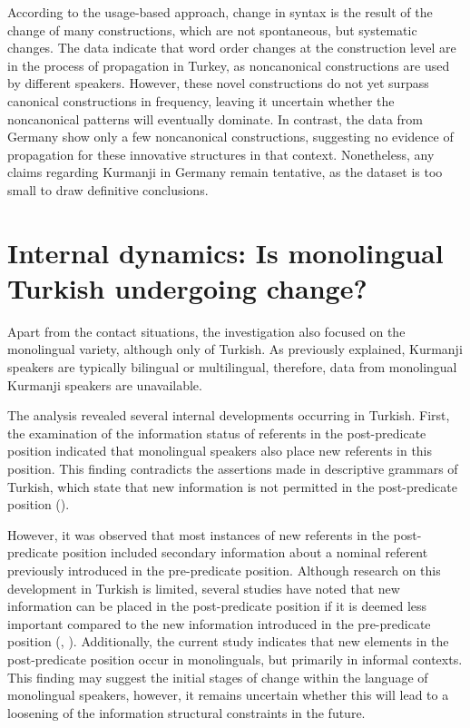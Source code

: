 According to the usage-based approach, change in syntax is the result of the change of many constructions, which are not spontaneous, but systematic changes. The data indicate that word order changes at the construction level are in the process of propagation in Turkey, as noncanonical constructions are used by different speakers. However, these novel constructions do not yet surpass canonical constructions in frequency, leaving it uncertain whether the noncanonical patterns will eventually dominate. In contrast, the data from Germany show only a few noncanonical constructions, suggesting no evidence of propagation for these innovative structures in that context. Nonetheless, any claims regarding Kurmanji in Germany remain tentative, as the dataset is too small to draw definitive conclusions.

\section{Internal dynamics: Is monolingual Turkish undergoing change?}\label{sec:key:7.2}

Apart from the contact situations, the investigation also focused on the monolingual variety, although only of Turkish. As previously explained, Kurmanji speakers are typically bilingual or multilingual, therefore, data from monolingual Kurmanji speakers are unavailable.

The analysis revealed several internal developments occurring in Turkish. First, the examination of the information status of referents in the post-predicate position indicated that monolingual speakers also place new referents in this position. This finding contradicts the assertions made in descriptive grammars of Turkish, which state that new information is not permitted in the post-predicate position (\citealt{Erguvanli1984, GokselÖzsoy2000, Issever2003}).

However, it was observed that most instances of new referents in the post-predicate position included secondary information about a nominal referent previously introduced in the pre-predicate position. Although research on this development in Turkish is limited, several studies have noted that new information can be placed in the post-predicate position if it is deemed less important compared to the new information introduced in the pre-predicate position (\citealt{DogruozBackus2007}, \citealt{AkanHartmann2019, Issever2019}). Additionally, the current study indicates that new elements in the post-predicate position occur in monolinguals, but primarily in informal contexts. This finding may suggest the initial stages of change within the language of monolingual speakers, however, it remains uncertain whether this will lead to a loosening of the information structural constraints in the future.

